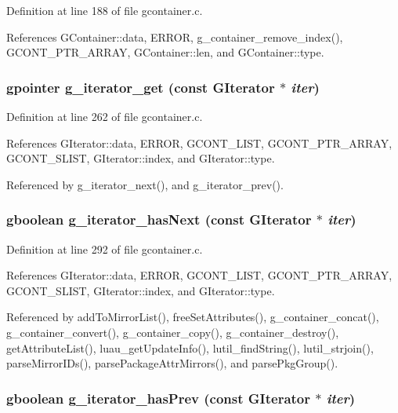 Definition at line 188 of file gcontainer.c.

References GContainer::data, ERROR, g\_\-container\_\-remove\_\-index(), GCONT\_\-PTR\_\-ARRAY, GContainer::len, and GContainer::type.
\subsubsection{\setlength{\rightskip}{0pt plus 5cm}gpointer g\_\-iterator\_\-get (const {\bf GIterator} $\ast$ {\em iter})}\label{gcontainer_8c_a14}




Definition at line 262 of file gcontainer.c.

References GIterator::data, ERROR, GCONT\_\-LIST, GCONT\_\-PTR\_\-ARRAY, GCONT\_\-SLIST, GIterator::index, and GIterator::type.

Referenced by g\_\-iterator\_\-next(), and g\_\-iterator\_\-prev().
\subsubsection{\setlength{\rightskip}{0pt plus 5cm}gboolean g\_\-iterator\_\-has\-Next (const {\bf GIterator} $\ast$ {\em iter})}\label{gcontainer_8c_a17}




Definition at line 292 of file gcontainer.c.

References GIterator::data, ERROR, GCONT\_\-LIST, GCONT\_\-PTR\_\-ARRAY, GCONT\_\-SLIST, GIterator::index, and GIterator::type.

Referenced by add\-To\-Mirror\-List(), free\-Set\-Attributes(), g\_\-container\_\-concat(), g\_\-container\_\-convert(), g\_\-container\_\-copy(), g\_\-container\_\-destroy(), get\-Attribute\-List(), luau\_\-get\-Update\-Info(), lutil\_\-find\-String(), lutil\_\-strjoin(), parse\-Mirror\-IDs(), parse\-Package\-Attr\-Mirrors(), and parse\-Pkg\-Group().
\subsubsection{\setlength{\rightskip}{0pt plus 5cm}gboolean g\_\-iterator\_\-has\-Prev (const {\bf GIterator} $\ast$ {\em iter})}\label{gcontainer_8c_a18}





